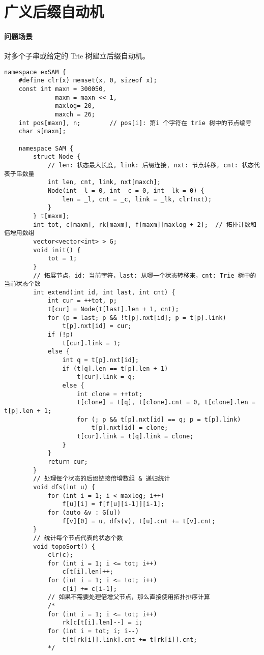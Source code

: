\section{广义后缀自动机}

\paragraph{问题场景} 对多个子串或给定的 Trie 树建立后缀自动机。

\begin{verbatim}
namespace exSAM {
    #define clr(x) memset(x, 0, sizeof x);
    const int maxn = 300050,
              maxm = maxn << 1,
              maxlog= 20,
              maxch = 26;
    int pos[maxn], n;        // pos[i]: 第i 个字符在 trie 树中的节点编号 
    char s[maxn];
    
    namespace SAM {
        struct Node {
            // len: 状态最大长度, link: 后缀连接, nxt: 节点转移, cnt: 状态代表子串数量 
            int len, cnt, link, nxt[maxch];
            Node(int _l = 0, int _c = 0, int _lk = 0) {
                len = _l, cnt = _c, link = _lk, clr(nxt);
            }
        } t[maxm];
        int tot, c[maxm], rk[maxm], f[maxm][maxlog + 2];  // 拓扑计数和倍增用数组 
        vector<vector<int> > G; 
        void init() {
            tot = 1;
        }
        // 拓展节点，id: 当前字符，last: 从哪一个状态转移来，cnt: Trie 树中的当前状态个数 
        int extend(int id, int last, int cnt) {
            int cur = ++tot, p;
            t[cur] = Node(t[last].len + 1, cnt);
            for (p = last; p && !t[p].nxt[id]; p = t[p].link)
                t[p].nxt[id] = cur;
            if (!p)
                t[cur].link = 1;
            else {
                int q = t[p].nxt[id];
                if (t[q].len == t[p].len + 1)
                    t[cur].link = q;
                else {
                    int clone = ++tot;
                    t[clone] = t[q], t[clone].cnt = 0, t[clone].len = t[p].len + 1;
                    for (; p && t[p].nxt[id] == q; p = t[p].link)
                        t[p].nxt[id] = clone;
                    t[cur].link = t[q].link = clone;
                }
            }
            return cur;
        }
        // 处理每个状态的后缀链接倍增数组 & 递归统计 
        void dfs(int u) {
            for (int i = 1; i < maxlog; i++)
                f[u][i] = f[f[u][i-1]][i-1];
            for (auto &v : G[u])
                f[v][0] = u, dfs(v), t[u].cnt += t[v].cnt;
        }
        // 统计每个节点代表的状态个数 
        void topoSort() {
            clr(c);
            for (int i = 1; i <= tot; i++)
                c[t[i].len]++;
            for (int i = 1; i <= tot; i++)
                c[i] += c[i-1];
            // 如果不需要处理倍增父节点，那么直接使用拓扑排序计算 
            /*
            for (int i = 1; i <= tot; i++)
                rk[c[t[i].len]--] = i;
            for (int i = tot; i; i--)
                t[t[rk[i]].link].cnt += t[rk[i]].cnt;
            */
            

\end{verbatim}
